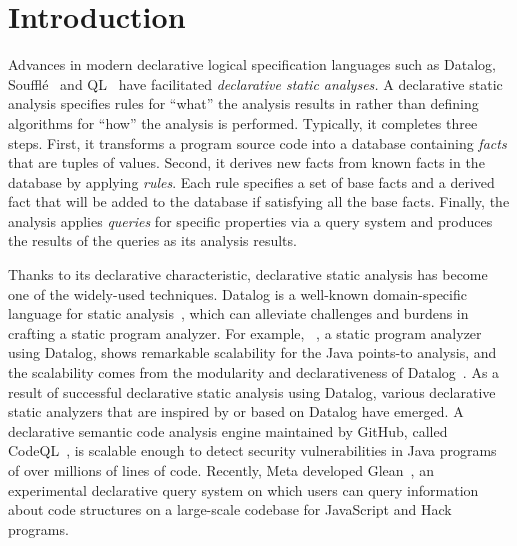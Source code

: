 \section{Introduction}
Advances in modern declarative logical specification languages such as
Datalog, Souffl\'{e}~\cite{souffle} and QL~\cite{ql2016} have facilitated
\emph{declarative static analyses.} A declarative static analysis specifies
rules for ``what'' the analysis results in rather than defining algorithms for
``how'' the analysis is performed.  Typically, it completes three steps.
First, it transforms a program source code into a database containing
\textit{facts} that are tuples of values.  Second, it derives new facts from
known facts in the database by applying {\it rules}.  Each rule specifies a set
of base facts and a derived fact that will be added to the database if
satisfying all the base facts.  Finally, the analysis applies {\it queries} for
specific properties via a query system and produces the results of the queries
as its analysis results.

Thanks to its declarative characteristic, declarative static analysis has
become one of the widely-used techniques.  Datalog is a well-known
domain-specific language for static analysis~\cite{doop, codequest, allen2015D,
allen2015stagedD, alpuente2010D, dawson1996D, naik2006D, reps1994D,
smaragdakis2014D, whaley2005D, scholz2016}, which can alleviate challenges and
burdens in crafting a static program analyzer.  For example, \doop~\cite{doop},
a static program analyzer using Datalog, shows remarkable scalability for the
Java points-to analysis, and the scalability comes from the modularity and
declarativeness of Datalog~\cite{doopWorkshop}.
As a result of successful declarative static analysis using Datalog,
various declarative static analyzers that are inspired by or based on Datalog
have emerged. A declarative semantic code
analysis engine maintained by GitHub, called CodeQL~\cite{codeql}, is scalable
enough to detect security vulnerabilities in Java programs of over millions of
lines of code.  Recently, Meta developed Glean~\cite{glean}, an experimental
declarative query system on which users can query information about code
structures on a large-scale codebase for JavaScript and Hack programs.


